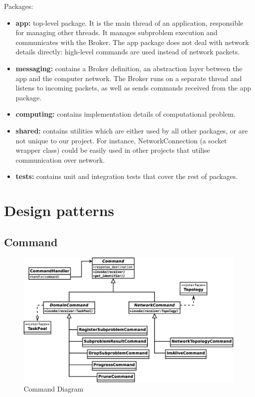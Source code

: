 \documentclass{article}
\begin{document}
Packages:
\begin{itemize}
    \item \textbf{app:} top-level package. It is the main thread of an application, responsible for managing other threads. It manages subproblem execution and communicates with the Broker. 
    The app package does not deal with network details directly: high-level commands are used instead of network packets.
    \item \textbf{messaging:} contains a Broker definition, an abstraction layer between the app and the computer network. 
    The Broker runs on a separate thread and listens to incoming packets, as well as sends commands received from the app package.
    \item \textbf{computing:} contains implementation details of computational problem.
    \item \textbf{shared:} contains utilities which are either used by all other packages, or are not unique to our project. 
    For instance, NetworkConnection (a socket wrapper class) could be easily used in other projects that utilise communication over network.
    \item \textbf{tests:} contains unit and integration tests that cover the rest of packages.
\end{itemize}

\section{Design patterns}
\subsection{Command}
\begin{figure}[H]
	\centering
	\includegraphics[width=\linewidth]{../diagrams/CommandDiagram.eps}
	\caption{Command Diagram}
\end{figure}
\end{document}
